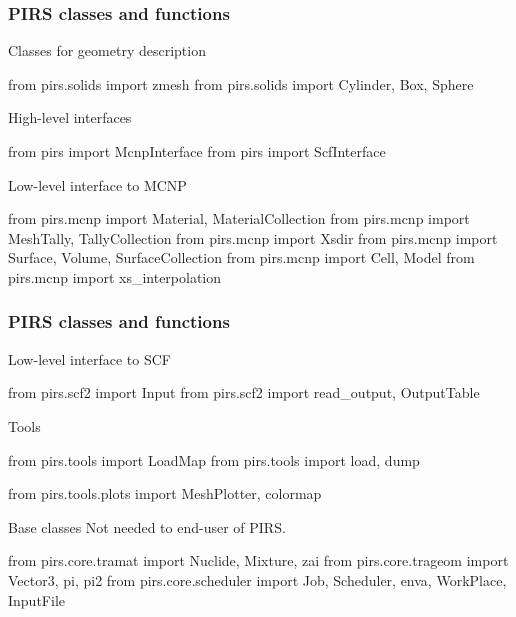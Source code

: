 \begin{frame}[fragile]
    \frametitle{PIRS classes and functions}

    \begin{block}{Classes for geometry description}
        \begin{pythoncode}
            from pirs.solids import zmesh
            from pirs.solids import Cylinder, Box, Sphere
        \end{pythoncode}
    \end{block}

    \begin{block}{High-level interfaces}
        \begin{pythoncode}
            from pirs import McnpInterface
            from pirs import ScfInterface
        \end{pythoncode}
    \end{block}

    \begin{block}{Low-level interface to MCNP}
        \begin{pythoncode}
            from pirs.mcnp import Material, MaterialCollection
            from pirs.mcnp import MeshTally, TallyCollection
            from pirs.mcnp import Xsdir
            from pirs.mcnp import Surface, Volume, SurfaceCollection
            from pirs.mcnp import Cell, Model
            from pirs.mcnp import xs_interpolation
        \end{pythoncode}
    \end{block}
\end{frame}

\begin{frame}[fragile]
    \frametitle{PIRS classes and functions}

    \begin{block}{Low-level interface to SCF}
        \begin{pythoncode}
            from pirs.scf2 import Input
            from pirs.scf2 import read_output, OutputTable
        \end{pythoncode}
    \end{block}

    \begin{block}{Tools}
        \begin{pythoncode}
            from pirs.tools import LoadMap
            from pirs.tools import load, dump

            from pirs.tools.plots import MeshPlotter, colormap
        \end{pythoncode}
    \end{block}

    \begin{block}{Base classes}
        Not needed to end-user of PIRS.
        \begin{pythoncode}
            from pirs.core.tramat import Nuclide, Mixture, zai
            from pirs.core.trageom import Vector3, pi, pi2
            from pirs.core.scheduler import Job, Scheduler, enva, WorkPlace, InputFile
        \end{pythoncode}
    \end{block}

\end{frame}


